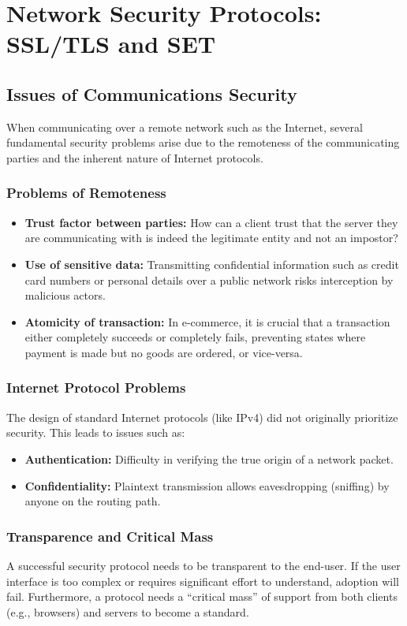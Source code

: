 \chapter{Network Security Protocols: SSL/TLS and SET}
\label{ch:network_security_protocols}

\section{Issues of Communications Security}
When communicating over a remote network such as the Internet, several fundamental security problems arise due to the remoteness of the communicating parties and the inherent nature of Internet protocols. 

\subsection{Problems of Remoteness}
\begin{itemize}
    \item \textbf{Trust factor between parties:} How can a client trust that the server they are communicating with is indeed the legitimate entity and not an impostor? 
    \item \textbf{Use of sensitive data:} Transmitting confidential information such as credit card numbers or personal details over a public network risks interception by malicious actors.
    \item \textbf{Atomicity of transaction:} In e-commerce, it is crucial that a transaction either completely succeeds or completely fails, preventing states where payment is made but no goods are ordered, or vice-versa.
\end{itemize}

\subsection{Internet Protocol Problems}
The design of standard Internet protocols (like IPv4) did not originally prioritize security. This leads to issues such as:
\begin{itemize}
    \item \textbf{Authentication:} Difficulty in verifying the true origin of a network packet.
    \item \textbf{Confidentiality:} Plaintext transmission allows eavesdropping (sniffing) by anyone on the routing path.
\end{itemize}

\subsection{Transparence and Critical Mass}
A successful security protocol needs to be transparent to the end-user. If the user interface is too complex or requires significant effort to understand, adoption will fail. Furthermore, a protocol needs a ``critical mass'' of support from both clients (e.g., browsers) and servers to become a standard.

